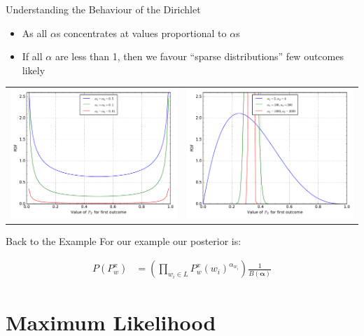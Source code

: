 \documentclass[11pt]{beamer}
\begin{document}
	\begin{frame}{Understanding the Behaviour of the Dirichlet}
		\begin{itemize}
			\item As all $\alpha$s concentrates at values proportional to $\alpha$s
			\item If all $\alpha$ are less than 1, then we favour ``sparse distributions'' few outcomes likely
		\end{itemize}
		
		\begin{tabular}{lr}
			\includegraphics[width=0.49\linewidth]{dirichlet_distribution_sparse_pdf} &
			\includegraphics[width=0.49\linewidth]{dirichlet_distribution_dense_pdf} \\
		\end{tabular}
	\end{frame}
		
	\begin{frame}{Back to the Example}
		For our example our posterior is:

		\vspace{10pt}		
		\begin{align*}
			P(P_{w}^x) & = \left(\prod_{w_i \in L} P_{w}^{x}(w_i)^{\alpha_{w_i}}\right) \frac{1}{B(\boldsymbol{\alpha})}
		\end{align*}
	\end{frame}
	
	\section{Maximum Likelihood}
	
\end{document}
